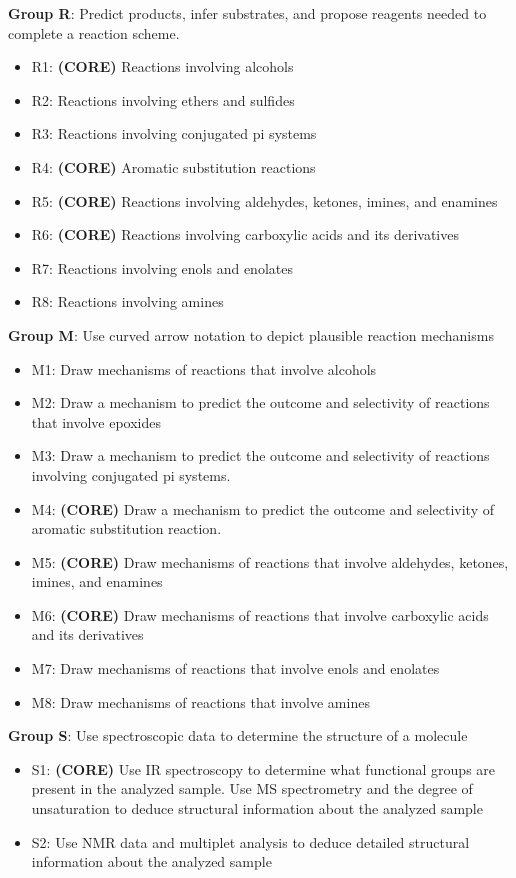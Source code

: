 \textbf{Group R}: Predict products, infer substrates, and propose
reagents needed to complete a reaction scheme.

\begin{itemize}
\tightlist
\item
  R1: \textbf{(CORE)} Reactions involving alcohols
\item
  R2: Reactions involving ethers and sulfides
\item
  R3: Reactions involving conjugated pi systems
\item
  R4: \textbf{(CORE)} Aromatic substitution reactions
\item
  R5: \textbf{(CORE)} Reactions involving aldehydes, ketones, imines,
  and enamines
\item
  R6: \textbf{(CORE)} Reactions involving carboxylic acids and its
  derivatives
\item
  R7: Reactions involving enols and enolates
\item
  R8: Reactions involving amines
\end{itemize}

\textbf{Group M}: Use curved arrow notation to depict plausible reaction
mechanisms

\begin{itemize}
\tightlist
\item
  M1: Draw mechanisms of reactions that involve alcohols
\item
  M2: Draw a mechanism to predict the outcome and selectivity of
  reactions that involve epoxides
\item
  M3: Draw a mechanism to predict the outcome and selectivity of
  reactions involving conjugated pi systems.
\item
  M4: \textbf{(CORE)} Draw a mechanism to predict the outcome and
  selectivity of aromatic substitution reaction.
\item
  M5: \textbf{(CORE)} Draw mechanisms of reactions that involve
  aldehydes, ketones, imines, and enamines
\item
  M6: \textbf{(CORE)} Draw mechanisms of reactions that involve
  carboxylic acids and its derivatives
\item
  M7: Draw mechanisms of reactions that involve enols and enolates
\item
  M8: Draw mechanisms of reactions that involve amines
\end{itemize}

\textbf{Group S}: Use spectroscopic data to determine the structure of a
molecule

\begin{itemize}
\tightlist
\item
  S1: \textbf{(CORE)} Use IR spectroscopy to determine what functional
  groups are present in the analyzed sample. Use MS spectrometry and the
  degree of unsaturation to deduce structural information about the
  analyzed sample
\item
  S2: Use NMR data and multiplet analysis to deduce detailed structural
  information about the analyzed sample
\end{itemize}
